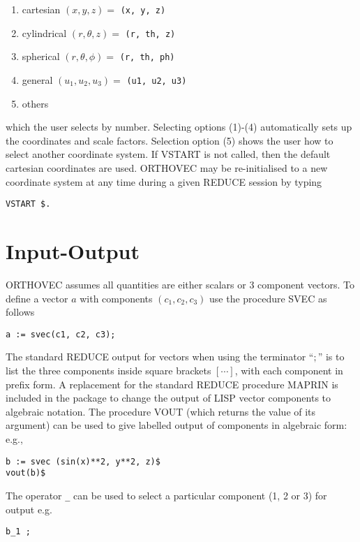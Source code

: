 \begin{enumerate}
\item cartesian $(x, y, z) = $ {\tt (x, y, z)}
\item cylindrical $(r, \theta, z) = $ {\tt (r, th, z)}
\item spherical $(r, \theta, \phi) = $ {\tt (r, th, ph) }
\item general $( u_1, u_2, u_3 ) = $ {\tt (u1, u2, u3) }
\item others
\end{enumerate}

which the user selects by number.  Selecting options (1)-(4)
automatically sets up the coordinates and scale factors.  Selection
option (5) shows the user how to select another coordinate system.  If
VSTART is not called, then the default cartesian coordinates are used.
ORTHOVEC may be re-initialised to a new coordinate system at any time
during a given REDUCE session by typing
\begin{verbatim}
VSTART $.
\end{verbatim}

\section{Input-Output}

ORTHOVEC assumes all quantities are either scalars or 3 component
vectors.  To define a vector $a$ with components $(c_1, c_2, c_3)$ use
the procedure SVEC as follows 
\begin{verbatim}
a := svec(c1, c2, c3);
\end{verbatim}

The standard REDUCE output for vectors when using the terminator ``$;$''
is to list the three components inside square brackets
$[\cdots]$, with each component in prefix form.  A replacement for the
standard REDUCE procedure MAPRIN is included in
the package to change the
output of LISP vector components to algebraic notation.  The procedure
 VOUT (which returns the value of its argument)
can be used to give labelled output of components
in algebraic form: e.g.,
\begin{verbatim}
b := svec (sin(x)**2, y**2, z)$
vout(b)$
\end{verbatim}

The operator {\tt \_} can be used to select a particular
component (1, 2 or 3) for output e.g.
\begin{verbatim}
b_1 ;
\end{verbatim}

